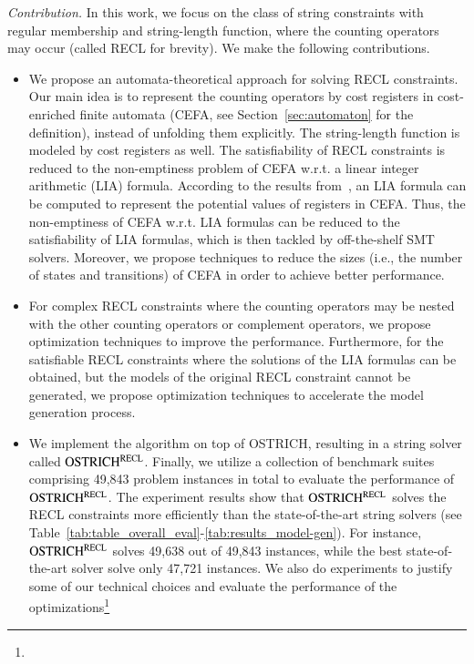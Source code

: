 \medskip
\noindent 
\emph{Contribution.} In this work, we focus on the class of string constraints with regular membership and string-length function, where the counting operators may occur (called RECL for brevity). We make the following contributions.
\begin{itemize}
  \item We propose an automata-theoretical approach for solving RECL constraints.
 Our main idea is to represent the counting operators by cost registers in cost-enriched finite automata (CEFA, see Section~\ref{sec:automaton} for the definition), instead of unfolding them explicitly. The string-length function is modeled by cost registers as well. The satisfiability of RECL constraints is reduced to the non-emptiness problem of CEFA w.r.t. a linear integer arithmetic (LIA) formula. According to the results from~\cite{atva2020}, an LIA formula can be computed to represent the potential values of registers in CEFA.
Thus, the non-emptiness of CEFA w.r.t. LIA formulas can be reduced to the satisfiability of LIA formulas, which is then tackled by off-the-shelf SMT solvers. Moreover, we propose techniques to reduce the sizes (i.e., the number of states and transitions) of CEFA in order to achieve better performance.
%
  \item For complex RECL constraints where the counting operators may be nested with the other counting operators or complement operators, we propose optimization techniques to improve the performance. Furthermore, for the satisfiable RECL constraints where the solutions of the LIA formulas can be obtained, but the models of the original RECL constraint cannot be generated,  we propose optimization techniques to accelerate the model generation process. 
%
\item We implement the algorithm on top of OSTRICH, resulting in a string solver called $\rm OSTRICH^{RECL}$. Finally, we utilize a collection of benchmark suites comprising 49,843 problem instances in total to evaluate the performance of $\rm OSTRICH^{RECL}$. The experiment results show that $\rm OSTRICH^{RECL}$ solves the RECL constraints more efficiently than the state-of-the-art string solvers (see Table~\ref{tab:table_overall_eval}-\ref{tab:results_model-gen}). For instance, $\rm OSTRICH^{RECL}$ solves 49,638 out of 49,843 instances, while the best state-of-the-art solver solve only 47,721 instances. We also do experiments to justify some of our technical choices and evaluate the performance of the optimizations\footnote{}
\end{itemize}
